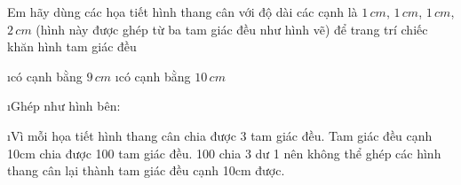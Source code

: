\begin{bt}
	Em hãy dùng các họa tiết hình thang cân với độ dài các cạnh là $1\, cm$, $1\, cm$, $1\,cm$, $2\, cm$  (hình này được ghép từ ba tam giác đều như hình vẽ) để trang trí chiếc khăn hình tam giác đều
	\begin{enumerate}[a), leftmargin=*]
		\i có cạnh bằng $9\,cm$
		\i có cạnh bằng $10\,cm$  
	\end{enumerate} 
	\begin{loigiaichuong35}
		\begin{enumerate}[a), leftmargin=*]
			\i Ghép như hình bên:  
			
			\i Vì mỗi họa tiết hình thang cân chia được 3 tam giác đều. Tam giác đều cạnh 10cm chia được 100 tam giác đều. 100 chia 3 dư 1 nên không thể ghép các hình thang cân lại thành tam giác đều cạnh 10cm được.
		\end{enumerate}
	\end{loigiaichuong35}
\end{bt}                                        
